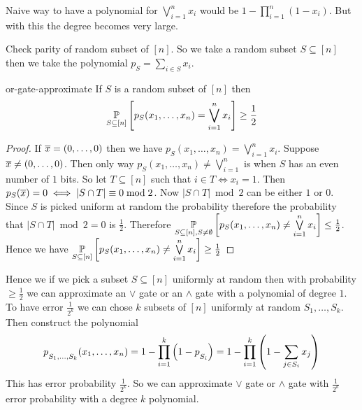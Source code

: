 Naive way to have a polynomial for $\bigvee\limits_{i=1}^n x_i$ would be $1-\prod\limits_{i=1}^n(1-x_i)$. But with this the degree becomes very large. 
\begin{idea*}
	Check parity of random subset of $[n]$. So we take a random subset $S\subseteq [n]$ then we take the polynomial $p_S=\sum\limits_{i\in S}x_i$. 
\end{idea*}
\begin{lemma}{}{or-gate-approximate}
	If $S$ is a random subset of $[n]$ then $$\underset{S\subseteq [n]}{\mathbb{P}}\left[p_S(x_1,\dots, x_n)=\bigvee\limits_{i=1}^n x_i\right]\geq\frac12$$
\end{lemma}
\begin{proof}
	If $\overline{x}=(0,\dots, 0)$ then we have $p_S(x_1,\dots, x_n)=\bigvee\limits_{i=1}^n x_i$. Suppose $\overline{x}\neq (0,\dots, 0)$. Then  only way $p_S(x_1,\dots, x_n)\neq \bigvee\limits_{i=1}^n $ is when $S$ has an even number of $1$ bits. So let $T\subseteq [n]$ such that $i\in T\iff x_i=1$. Then $p_S(\overline{x})=0\iff |S\cap T|\equiv 0\bmod 2$. Now $|S\cap T|\bmod 2$ can be either $1$ or $0$. Since $S$ is picked uniform at random the probability therefore the probability that $|S\cap T|\bmod 2=0$ is $\frac12$. Therefore $\underset{S\subseteq [n], S\neq \emptyset}{\mathbb{P}}\left[p_S(x_1,\dots, x_n)\neq \bigvee\limits_{i=1}^n x_i\right]\leq\frac12$. Hence we have $\underset{S\subseteq [n]}{\mathbb{P}}\left[p_S(x_1,\dots, x_n)\neq \bigvee\limits_{i=1}^n x_i\right]\geq\frac12$
\end{proof}

Hence we if we pick a subset $S\subseteq [n]$ uniformly at random then with probability $\geq \frac12$ we can approximate an $\vee$ gate or an $\wedge$ gate with a polynomial of degree $1$. To have error $\frac1{2^k}$ we can chose $k$ subsets of $[n]$ uniformly at random $S_1,\dots, S_k$. Then construct the polynomial $$p\strut_{S_1,\dots, S_k}(x_1,\dots, x_n)=1-\prod_{i=1}^k\left(1-p\strut_{S_i}\right)=1-\prod_{i=1}^k \left(1-\sum_{j\in S_i} x_j\right)$$This has error probability $\frac1{2^k}$. So we can approximate $\vee$ gate or $\wedge$ gate with $\frac1{2^k}$ error probability with a degree $k$ polynomial. \vspace*{2mm}

